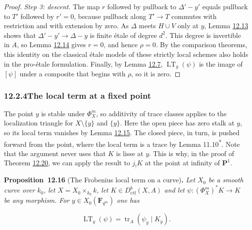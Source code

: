 \documentclass[11pt]{article}
\newenvironment{bpstatement}[2]{\par\addvspace{0.6\baselineskip}\noindent\textbf{#1}#2\textbf{.}\enspace\ignorespaces}
  {\par\addvspace{0.4\baselineskip}}
\newenvironment{bpstatementit}[2]{\begin{bpstatement}{#1}{#2}\itshape\ignorespaces}{\end{bpstatement}}
\newcommand{\bpout}[1]{#1\textsuperscript{\hyperlink{bp-outside}{\ensuremath{\ast}}}}
\begin{document}
\begin{proof}[{Proof}]
\emph{Step 3: descent.} The map \(r\) followed by pullback to \(\Delta'-y'\) equals pullback to \(T'\) followed by \(r'=0\), because pullback along \(T'\to T\) commutes with restriction and with extension by zero. As \(\Delta\) meets \(H\cup V\) only at \(y\), Lemma \hyperref[bp40]{12.13} shows that \(\Delta'-y'\to\Delta-y\) is finite étale of degree \(d^2\). This degree is invertible in \(A\), so Lemma \hyperref[bp42]{12.14} gives \(r=0\), and hence \(\rho=0\). By the comparison theorems, this identity on the classical étale models of these strictly local schemes also holds in the pro-étale formulation. Finally, by Lemma \hyperref[bp21]{12.7}, \(\operatorname{LT}_y(\psi)\) is the image of \([\psi]\) under a composite that begins with \(\rho\), so it is zero.
\end{proof}


\subsubsection*{\texorpdfstring{12.2.4\quad The local term at a fixed point}{12.2.4 The local term at a fixed point}}
\label{bp47}%
\label{bp48}%
The point \(y\) is stable under \(\Phi_X^m\), so additivity of trace classes applies to the localization triangle for \(X\setminus\{y\}\) and \(\{y\}\). Here the open piece has zero stalk at \(y\), so its local term vanishes by Lemma \hyperref[bp45]{12.15}. The closed piece, in turn, is pushed forward from the point, where the local term is a trace by Lemma \bpout{11.10}. Note that the argument never uses that \(K\) is lisse at \(y\). This is why, in the proof of Theorem \hyperref[bp62]{12.20}, we can apply the result to \(j_!K\) at the point at infinity of \(\mathbf P^1\).

\label{bp49}%
\begin{bpstatementit}{Proposition~12.16}{ (The Frobenius local term on a curve)}
Let \(X_0\) be a smooth curve over \(k_0\), let \(X=X_0\times_{k_0}k\), let \(K\in D^b_{\mathrm{ctf}}(X,A)\) and let \(\psi:(\Phi_X^m)^*K\to K\) be any morphism. For \(y\in X_0(\mathbf F_{q^m})\) one has

\[
\operatorname{LT}_y(\psi)
=\operatorname{tr}_A(\psi_{\bar y}\mid K_{\bar y}).
\]
\end{bpstatementit}
\end{document}
